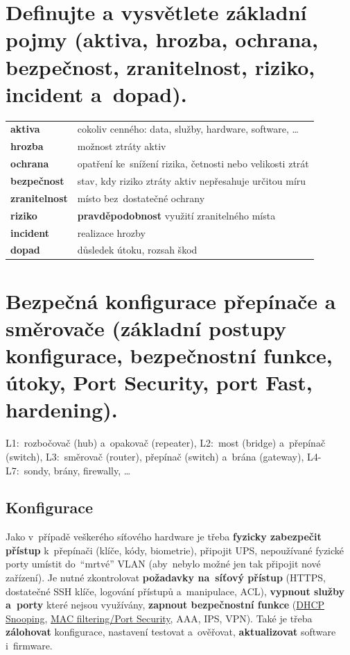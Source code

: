 \section{Definujte a vysvětlete základní pojmy (aktiva, hrozba, ochrana, bezpečnost, zranitelnost, riziko, incident a~dopad).}

\begin{table}[ht]
    \begin{tabular}{l|l}
        \textbf{aktiva}       & cokoliv cenného: data, služby, hardware, software, \dots  \\
        \textbf{hrozba}       & možnost ztráty aktiv                                      \\
        \textbf{ochrana}      & opatření ke~snížení rizika, četnosti nebo velikosti ztrát \\
        \textbf{bezpečnost}   & stav, kdy riziko ztráty aktiv nepřesahuje určitou míru    \\
        \textbf{zranitelnost} & místo bez~dostatečné ochrany                              \\
        \textbf{riziko}       & \textbf{pravděpodobnost} využití zranitelného místa       \\
        \textbf{incident}     & realizace hrozby                                          \\
        \textbf{dopad}        & důsledek útoku, rozsah škod                               \\
    \end{tabular}
\end{table}

\clearpage
\section{Bezpečná konfigurace přepínače a směrovače (základní postupy konfigurace, bezpečnostní funkce, útoky, Port Security, port Fast, hardening).}

L1:~rozbočovač (hub) a~opakovač (repeater), L2:~most (bridge) a~přepínač (switch), L3:~směrovač (router), přepínač (switch) a~brána (gateway), L4-L7:~sondy, brány, firewally, \dots

\subsection{Konfigurace}
\label{question2-1}

Jako v~případě veškerého síťového hardware je třeba \textbf{fyzicky zabezpečit přístup} k~přepínači (klíče, kódy, biometrie), připojit UPS, nepoužívané fyzické porty umístit do~\enquote{mrtvé} VLAN (aby~nebylo možné jen tak připojit nové zařízení). Je nutné zkontrolovat \textbf{požadavky na~síťový přístup} (HTTPS, dostatečné SSH klíče, logování přístupů a~manipulace, ACL), \textbf{vypnout služby a~porty} které nejsou využívány, \textbf{zapnout bezpečnostní funkce} (\href{https://en.wikipedia.org/wiki/DHCP_snooping}{DHCP Snooping}, \href{https://en.wikipedia.org/wiki/MAC_filtering}{MAC filtering/Port Security}, AAA, IPS, VPN). Také je třeba \textbf{zálohovat} konfigurace, nastavení testovat a~ověřovat, \textbf{aktualizovat} software i~firmware.

